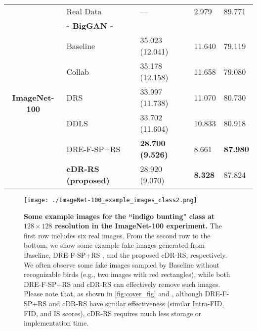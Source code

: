 \documentclass[final,12pt, 3p,times]{elsarticle}
\begin{document}
\begin{table}[htbp]
\begin{adjustbox}{width=0.5\textwidth}
\begin{tabular}{rllll}
			\midrule
			
			\multicolumn{1}{c}{} & Real Data & --- & 2.979 & 89.771 \\
			\cline{2-5}
			\multicolumn{1}{c}{\multirow{7}[0]{*}{\begin{sideways}\textbf{ImageNet-100}\end{sideways}}} & \textbf{- BigGAN -} &       &       &  \\
			\multicolumn{1}{c}{} & Baseline & 35.023 (12.041) & 11.640 & 79.119 \\
			\multicolumn{1}{c}{} & Collab \cite{liu2020collaborative} & 35.178 (12.158) & 11.658 & 79.080 \\
			\multicolumn{1}{c}{} & DRS \cite{azadi2018discriminator}  & 33.997 (11.738) & 11.070 & 80.730 \\
			\multicolumn{1}{c}{} & DDLS \cite{che2020your} & 33.702 (11.604) & 10.833 & 80.918 \\
			\multicolumn{1}{c}{} & DRE-F-SP+RS \cite{ding2020subsampling} & \textbf{28.700 (9.526)} & 8.661 & \textbf{87.980} \\
			\multicolumn{1}{c}{} & \textbf{cDR-RS (proposed)} & 28.920 (9.070) & \textbf{8.328} & 87.824 \\
			\bottomrule
		\end{tabular}\end{adjustbox}
	\label{tab:effectiveness_analysis_classification}\end{table}



\begin{figure}[t] \centering
	\texttt{[image: ./ImageNet-100\_example\_images\_class2.png]} 
	\caption{\textbf{Some example images for the ``indigo bunting" class at $128\times 128$ resolution in the ImageNet-100 experiment.} The first row includes six real images. From the second row to the bottom, we show some example fake images generated from Baseline, DRE-F-SP+RS \cite{ding2020subsampling}, and the proposed cDR-RS, respectively. We often observe some fake images sampled by Baseline without recognizable birds (e.g., two images with red rectangles), while both DRE-F-SP+RS and cDR-RS can effectively remove such images. Please note that, as shown in \cref{fig:cover_fig} and , although DRE-F-SP+RS and cDR-RS have similar effectiveness (similar Intra-FID, FID, and IS scores), cDR-RS requires much less storage or implementation time.}
	\label{fig:ImageNet-100_example_images}
\end{figure}
\end{document}
